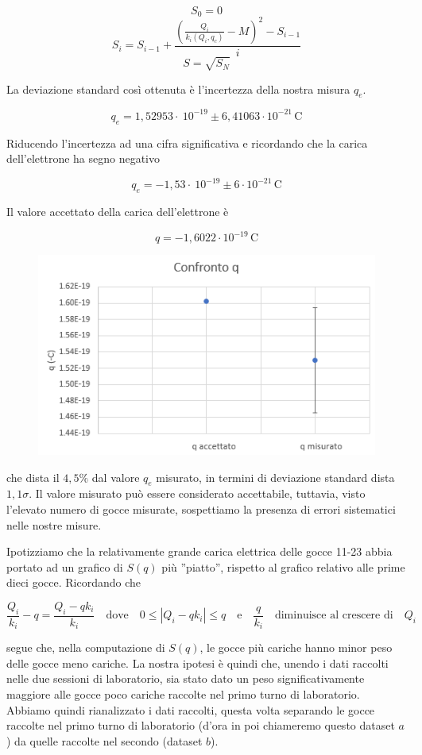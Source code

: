 \documentclass{article}
\begin{document}
\[S_0 = 0\]
\[S_i = S_{i-1} + \frac{(\frac{Q_i}{k_i(Q_i,q_c)} - M)^2 - S_{i-1}}{i}\]
\[S=\sqrt{S_N}\]

La deviazione standard così ottenuta è l'incertezza della nostra misura $q_e$.

\[q_e = 1,52953 \cdot\ 10^{-19} \pm 6,41063 \cdot 10^{-21} \, \textrm{C}\]

Riducendo l'incertezza ad una cifra significativa e ricordando che la carica dell'elettrone ha segno negativo

\[q_e = - 1,53 \cdot\ 10^{-19} \pm 6 \cdot 10^{-21} \, \textrm{C}\]

Il valore accettato della carica dell'elettrone è 

\[q= - 1,6022 \cdot 10^{-19} \, \textrm{C}\]

\begin{figure}[h]
\centering
\includegraphics[width=0.7\linewidth]{Confronto_q}
\end{figure}

che dista il $4,5 \%$ dal valore $q_e$ misurato, in termini di deviazione standard dista $1,1 \sigma$. Il valore misurato può essere considerato accettabile, tuttavia, visto l'elevato numero di gocce misurate, sospettiamo la presenza di errori sistematici nelle nostre misure.

\vspace{5mm}

Ipotizziamo che la relativamente grande carica elettrica delle gocce 11-23 abbia portato ad un grafico di $S(q)$ più ''piatto'', rispetto al grafico relativo alle prime dieci gocce. Ricordando che 

\[\frac{Q_i}{k_i} - q = \frac{Q_i - qk_i}{k_i} \quad \textrm{dove} \quad 0 \leq \left|Q_i - qk_i\right| \leq q \quad \textrm{e} \quad \frac{q}{k_i} \quad \textrm{diminuisce al crescere di} \quad Q_i\]

segue che, nella computazione di $S(q)$, le gocce più cariche hanno minor peso delle gocce meno cariche. La nostra ipotesi è quindi che, unendo i dati raccolti nelle due sessioni di laboratorio, sia stato dato un peso significativamente maggiore alle gocce poco cariche raccolte nel primo turno di laboratorio. Abbiamo quindi rianalizzato i dati raccolti, questa volta separando le gocce raccolte nel primo turno di laboratorio (d'ora in poi chiameremo questo dataset $a$) da quelle raccolte nel secondo (dataset $b$).
\end{document}
